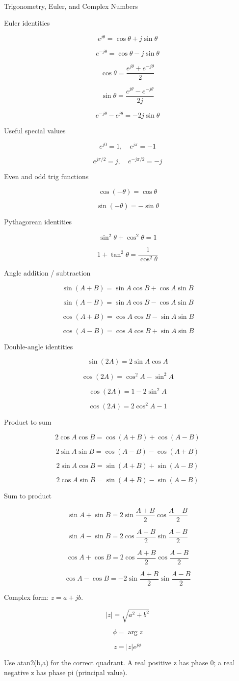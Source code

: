 Trigonometry, Euler, and Complex Numbers

Euler identities

$$e^{j\theta}=\cos\theta+j\sin\theta$$

$$e^{-j\theta}=\cos\theta-j\sin\theta$$

$$\cos\theta=\frac{e^{j\theta}+e^{-j\theta}}{2}$$

$$\sin\theta=\frac{e^{j\theta}-e^{-j\theta}}{2j}$$

$$e^{-j\theta}-e^{j\theta}=-2j\sin\theta$$

Useful special values

$$e^{j0}=1,\quad e^{j\pi}=-1$$

$$e^{j\pi/2}=j,\quad e^{-j\pi/2}=-j$$

Even and odd trig functions

$$\cos(-\theta)=\cos\theta$$

$$\sin(-\theta)=-\sin\theta$$

Pythagorean identities

$$\sin^2\theta+\cos^2\theta=1$$

$$1+\tan^2\theta=\frac{1}{\cos^2\theta}$$

Angle addition / subtraction

$$\sin(A+B)=\sin A\cos B+\cos A\sin B$$

$$\sin(A-B)=\sin A\cos B-\cos A\sin B$$

$$\cos(A+B)=\cos A\cos B-\sin A\sin B$$

$$\cos(A-B)=\cos A\cos B+\sin A\sin B$$

Double-angle identities

$$\sin(2A)=2\sin A\cos A$$

$$\cos(2A)=\cos^2A-\sin^2A$$

$$\cos(2A)=1-2\sin^2A$$

$$\cos(2A)=2\cos^2A-1$$

Product to sum

$$2\cos A\cos B=\cos(A+B)+\cos(A-B)$$

$$2\sin A\sin B=\cos(A-B)-\cos(A+B)$$

$$2\sin A\cos B=\sin(A+B)+\sin(A-B)$$

$$2\cos A\sin B=\sin(A+B)-\sin(A-B)$$

Sum to product

$$\sin A+\sin B=2\sin\frac{A+B}{2}\cos\frac{A-B}{2}$$

$$\sin A-\sin B=2\cos\frac{A+B}{2}\sin\frac{A-B}{2}$$

$$\cos A+\cos B=2\cos\frac{A+B}{2}\cos\frac{A-B}{2}$$

$$\cos A-\cos B=-2\sin\frac{A+B}{2}\sin\frac{A-B}{2}$$

Complex form: $z=a+jb$.

$$|z|=\sqrt{a^2+b^2}$$

$$\phi=\arg z$$

$$z=|z|e^{j\phi}$$

Use atan2(b,a) for the correct quadrant. A real positive z has phase 0; a real negative z has phase pi (principal value).
